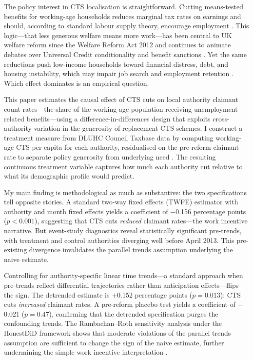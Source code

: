 \documentclass[12pt]{article}
\begin{document}
The policy interest in CTS localisation is straightforward. Cutting means-tested benefits for working-age households reduces marginal tax rates on earnings and should, according to standard labour supply theory, encourage employment \citep{moffitt2002welfare, saez2002optimal}. This logic---that less generous welfare means more work---has been central to UK welfare reform since the Welfare Reform Act 2012 and continues to animate debates over Universal Credit conditionality and benefit sanctions \citep{brewer2019did, beatty2014welfare}. Yet the same reductions push low-income households toward financial distress, debt, and housing instability, which may impair job search and employment retention \citep{jrf2015council, costa2019welfare}. Which effect dominates is an empirical question.

This paper estimates the causal effect of CTS cuts on local authority claimant count rates---the share of the working-age population receiving unemployment-related benefits---using a difference-in-differences design that exploits cross-authority variation in the generosity of replacement CTS schemes. I construct a treatment measure from DLUHC Council Taxbase data by computing working-age CTS per capita for each authority, residualised on the pre-reform claimant rate to separate policy generosity from underlying need \citep{dluhc2013taxbase}. The resulting continuous treatment variable captures how much each authority cut relative to what its demographic profile would predict.

My main finding is methodological as much as substantive: the two specifications tell opposite stories. A standard two-way fixed effects (TWFE) estimator with authority and month fixed effects yields a coefficient of $-$0.156 percentage points ($p < 0.001$), suggesting that CTS cuts \emph{reduced} claimant rates---the work incentive narrative. But event-study diagnostics reveal statistically significant pre-trends, with treatment and control authorities diverging well before April 2013. This pre-existing divergence invalidates the parallel trends assumption underlying the naive estimate.

Controlling for authority-specific linear time trends---a standard approach when pre-trends reflect differential trajectories rather than anticipation effects---flips the sign. The detrended estimate is $+$0.152 percentage points ($p = 0.013$): CTS cuts \emph{increased} claimant rates. A pre-reform placebo test yields a coefficient of $-$0.021 ($p = 0.47$), confirming that the detrended specification purges the confounding trends. The Rambachan--Roth sensitivity analysis under the HonestDiD framework shows that moderate violations of the parallel trends assumption are sufficient to change the sign of the naive estimate, further undermining the simple work incentive interpretation \citep{rambachan2023more}.
\end{document}
